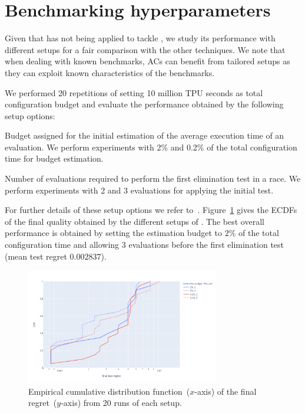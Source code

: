 \section{Benchmarking \irace hyperparameters}
Given that \irace has not being applied to tackle \nasbench, we study its performance with different setups for a fair comparison with the other \nasbench techniques. We note that when dealing with known benchmarks, ACs can benefit from tailored setups as they can exploit known characteristics of the benchmarks.


We performed 20 repetitions of \irace setting 10 million TPU seconds as total configuration budget and evaluate the performance obtained by the following setup options:

\begin{description}[style=unboxed, leftmargin=0px]
\item[Estimation budget] Budget assigned for the initial estimation of the average execution time of an evaluation. We perform experiments with 2\% and 0.2\% of the total configuration time for budget estimation.
\item[First test] Number of evaluations required to perform the first elimination test in a race. We perform experiments with 2 and 3 evaluations for applying the initial test.
\end{description}

For further details of these setup options we refer to~\cite{LopDubPerStuBir2016irace}. Figure~\ref{fig:irace-setup-performance} gives the ECDFs of the final quality obtained by the different setups of \irace. The best overall performance is obtained by setting the estimation budget to $2\%$ of the total configuration time and allowing 3 evaluations before the first elimination test (mean test regret $0.002837$).
\begin{figure}
	\centering
	\includegraphics[width=0.75\textwidth]{imgs/irace-setup-ecdf.png}
	\caption{Empirical cumulative distribution function~($x$-axis) of the final regret~($y$-axis) from 20 runs of each \irace setup.}
	\label{fig:irace-setup-performance}
\end{figure}

